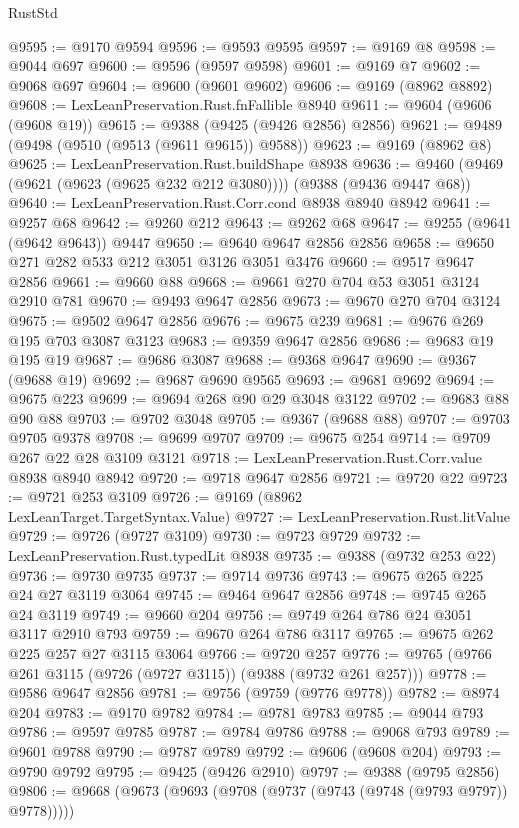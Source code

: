 \begin{lexlean}{RustStd}
\begin{coremodule}
@9595 := @9170 @9594
@9596 := @9593 @9595
@9597 := @9169 @8
@9598 := @9044 @697
@9600 := @9596 (@9597 @9598)
@9601 := @9169 @7
@9602 := @9068 @697
@9604 := @9600 (@9601 @9602)
@9606 := @9169 (@8962 @8892)
@9608 := LexLeanPreservation.Rust.fnFallible @8940
@9611 := @9604 (@9606 (@9608 @19))
@9615 := @9388 (@9425 (@9426 @2856) @2856)
@9621 := @9489 (@9498 (@9510 (@9513 (@9611 @9615)) @9588))
@9623 := @9169 (@8962 @8)
@9625 := LexLeanPreservation.Rust.buildShape @8938
@9636 := @9460 (@9469 (@9621 (@9623 (@9625 @232 @212 @3080)))) (@9388 (@9436 @9447 @68))
@9640 := LexLeanPreservation.Rust.Corr.cond @8938 @8940 @8942
@9641 := @9257 @68
@9642 := @9260 @212
@9643 := @9262 @68
@9647 := @9255 (@9641 (@9642 @9643)) @9447
@9650 := @9640 @9647 @2856 @2856
@9658 := @9650 @271 @282 @533 @212 @3051 @3126 @3051 @3476
@9660 := @9517 @9647 @2856
@9661 := @9660 @88
@9668 := @9661 @270 @704 @53 @3051 @3124 @2910 @781
@9670 := @9493 @9647 @2856
@9673 := @9670 @270 @704 @3124
@9675 := @9502 @9647 @2856
@9676 := @9675 @239
@9681 := @9676 @269 @195 @703 @3087 @3123
@9683 := @9359 @9647 @2856
@9686 := @9683 @19 @195 @19
@9687 := @9686 @3087
@9688 := @9368 @9647
@9690 := @9367 (@9688 @19)
@9692 := @9687 @9690 @9565
@9693 := @9681 @9692
@9694 := @9675 @223
@9699 := @9694 @268 @90 @29 @3048 @3122
@9702 := @9683 @88 @90 @88
@9703 := @9702 @3048
@9705 := @9367 (@9688 @88)
@9707 := @9703 @9705 @9378
@9708 := @9699 @9707
@9709 := @9675 @254
@9714 := @9709 @267 @22 @28 @3109 @3121
@9718 := LexLeanPreservation.Rust.Corr.value @8938 @8940 @8942
@9720 := @9718 @9647 @2856
@9721 := @9720 @22
@9723 := @9721 @253 @3109
@9726 := @9169 (@8962 LexLeanTarget.TargetSyntax.Value)
@9727 := LexLeanPreservation.Rust.litValue
@9729 := @9726 (@9727 @3109)
@9730 := @9723 @9729
@9732 := LexLeanPreservation.Rust.typedLit @8938
@9735 := @9388 (@9732 @253 @22)
@9736 := @9730 @9735
@9737 := @9714 @9736
@9743 := @9675 @265 @225 @24 @27 @3119 @3064
@9745 := @9464 @9647 @2856
@9748 := @9745 @265 @24 @3119
@9749 := @9660 @204
@9756 := @9749 @264 @786 @24 @3051 @3117 @2910 @793
@9759 := @9670 @264 @786 @3117
@9765 := @9675 @262 @225 @257 @27 @3115 @3064
@9766 := @9720 @257
@9776 := @9765 (@9766 @261 @3115 (@9726 (@9727 @3115)) (@9388 (@9732 @261 @257)))
@9778 := @9586 @9647 @2856
@9781 := @9756 (@9759 (@9776 @9778))
@9782 := @8974 @204
@9783 := @9170 @9782
@9784 := @9781 @9783
@9785 := @9044 @793
@9786 := @9597 @9785
@9787 := @9784 @9786
@9788 := @9068 @793
@9789 := @9601 @9788
@9790 := @9787 @9789
@9792 := @9606 (@9608 @204)
@9793 := @9790 @9792
@9795 := @9425 (@9426 @2910)
@9797 := @9388 (@9795 @2856)
@9806 := @9668 (@9673 (@9693 (@9708 (@9737 (@9743 (@9748 (@9793 @9797)) @9778)))))

\end{coremodule}
\end{lexlean}
